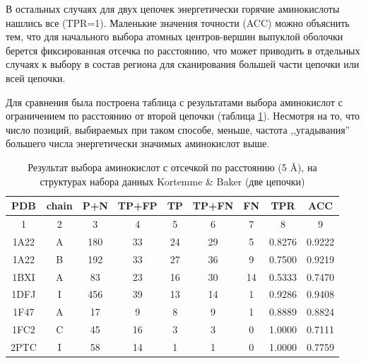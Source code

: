 В остальных случаях для двух цепочек энергетически горячие аминокислоты нашлись все (TPR=1). Маленькие значения точности (ACC) можно объяснить тем, что для начального выбора атомных центров-вершин выпуклой оболочки берется фиксированная отсечка по расстоянию, что может приводить в отдельных случаях к выбору в состав региона для сканирования большей части цепочки или всей цепочки.

Для сравнения была построена таблица с результатами выбора аминокислот с ограничением по расстоянию от второй цепочки (таблица \ref{tab:comparison2}). Несмотря на то, что число позиций, выбираемых при таком способе, меньше, частота ,,угадывания'' большего числа энергетически значимых аминокислот выше.
\begin{table}[h]
\begin{center}
\caption{Результат выбора аминокислот с отсечкой по расстоянию (5 \AA{}), на структурах набора данных Kortemme \& Baker (две цепочки) }
\label{tab:comparison2}
\begin{tabular}{|c|c|c|c|c|c|c|c|c|}
\hline
 PDB & chain & P+N & TP+FP & TP & TP+FN & FN & TPR & ACC \\
 \hline
  1 & 2 & 3 & 4 & 5 & 6 & 7 & 8 & 9 \\
 \hline
1A22 & A & 180 & 33 & 24 & 29 & 5 & 0.8276 & 0.9222\\
1A22 & B & 192 & 33 & 27 & 36 & 9 & 0.7500 & 0.9219\\
1BXI & A & 83 & 23 & 16 & 30 & 14 & 0.5333 & 0.7470\\
1DFJ & I & 456 & 39 & 13 & 14 & 1 & 0.9286 & 0.9408\\
1F47 & A & 17 & 9 & 8 & 9 & 1 & 0.8889 & 0.8824\\
1FC2 & C & 45 & 16 & 3 & 3 & 0 & 1.0000 & 0.7111\\
2PTC & I & 58 & 14 & 1 & 1 & 0 & 1.0000 & 0.7759\\
\hline
\end{tabular}
\end{center}
\end{table}


